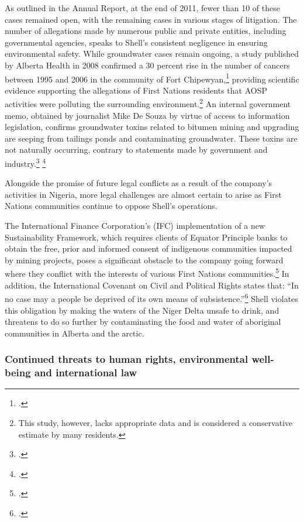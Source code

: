 \documentclass[10pt]{article}
\begin{document}
\begin{description}
As outlined in the Annual Report, at the end of 2011, fewer than 10 of these cases remained open, with the remaining cases in various stages of litigation. The number of allegations made by numerous public and private entities, including governmental agencies, speaks to Shell's consistent negligence in ensuring environmental safety. While groundwater cases remain ongoing, a study published by Alberta Health in 2008 confirmed a 30 percent rise in the number of cancers between 1995 and 2006 in the community of Fort Chipewyan,\footcite[][]{RiskingRuin_2012} providing scientific evidence supporting the allegations of First Nations residents that AOSP activities were polluting the surrounding environment.\footnote{This study, however, lacks appropriate data and is considered a conservative estimate by many residents.} An internal government memo, obtained by journalist Mike De Souza by virtue of access to information legislation, confirms groundwater toxins related to bitumen mining and upgrading are seeping from tailings ponds and contaminating groundwater. These toxins are not naturally occurring, contrary to statements made by government and industry.\footcite[][]{Memorandum_2012} \footcite[See also: ][]{TailingsLeaking}
\end{description}


Alongside the promise of future legal conflicts as a result of the company's activities in Nigeria, more legal challenges are almost certain to arise as First Nations communities continue to oppose Shell's operations. 



The International Finance Corporation's (IFC) implementation of a new Sustainability Framework, which requires clients of Equator Principle banks to obtain the free, prior and informed consent of indigenous communities impacted by mining projects, poses a significant obstacle to the company going forward where they conflict with the interests of various First Nations communities.\footcite[][]{Sosa_2011}
In addition, the International Covenant on Civil and Political Rights states that: ``In no case may a people be deprived of its own means of subsistence.''\footcite[Part I, Article I (2)][]{CivilAndPolitical}
Shell violates this obligation by making the waters of the Niger Delta unsafe to drink, and threatens to do so further by contaminating the food and water of aboriginal communities in Alberta and the arctic.



	\subsubsection{Continued threats to human rights, environmental well-being and international law}
	
\end{document}
